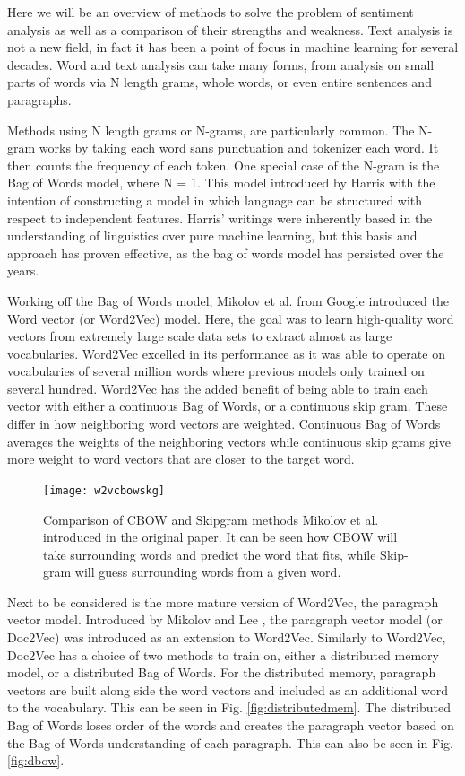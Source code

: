 \documentclass[journal]{IEEEtran}
\begin{document}
Here we will be an overview of methods to solve the problem of sentiment analysis as well as a comparison of their strengths and weakness.
Text analysis is not a new field, in fact it has been a point of focus in machine learning for several decades. Word and text analysis can take many forms, from analysis on small parts of words via N length grams, whole words, or even entire sentences and paragraphs. 

Methods using N length grams or N-grams, are particularly common. The N-gram works by taking each word sans punctuation and tokenizer each word. It then counts the frequency of each token. \cite{NGramText} One special case of the N-gram is the Bag of Words model, where N = 1. This model introduced by Harris \cite{harrisZelligoW} with the intention of constructing a model in which language can be structured with respect to independent features. Harris’ writings were inherently based in the understanding of linguistics over pure machine learning, but this basis and approach has proven effective, as the bag of words model has persisted over the years.

Working off the Bag of Words model, Mikolov et al. \cite{word2vec} from Google introduced the Word vector (or Word2Vec) model. Here, the goal was to learn high-quality word vectors from extremely large scale data sets to extract almost as large vocabularies. Word2Vec excelled in its performance as it was able to operate on vocabularies of several million words where previous models only trained on several hundred. Word2Vec has the added benefit of being able to train each vector with either a continuous Bag of Words, or a continuous skip gram. These differ in how neighboring word vectors are weighted. Continuous Bag of Words averages the weights of the neighboring vectors while continuous skip grams give more weight to word vectors that are closer to the target word. 

\begin{figure}[ht]
\centering
\texttt{[image: w2vcbowskg]}
\caption{Comparison of CBOW and Skipgram methods Mikolov et al. \cite{word2vec} introduced in the original paper. It can be seen how CBOW will take surrounding words and predict the word that fits, while Skip-gram will guess surrounding words from a given word.}
\label{fig:w2vcbowskg}
\end{figure}

Next to be considered is the more mature version of Word2Vec, the paragraph vector model. Introduced by Mikolov and Lee \cite{doc2vec}, the paragraph vector model (or Doc2Vec) was introduced as an extension to Word2Vec. Similarly to Word2Vec, Doc2Vec has a choice of two methods to train on, either a distributed memory model, or a distributed Bag of Words. For the distributed memory, paragraph vectors are built along side the word vectors and included as an additional word to the vocabulary. This can be seen in Fig. \ref{fig:distributedmem}. The distributed Bag of Words loses order of the words and creates the paragraph vector based on the Bag of Words understanding of each paragraph. This can also be seen in Fig. \ref{fig:dbow}.
\end{document}

